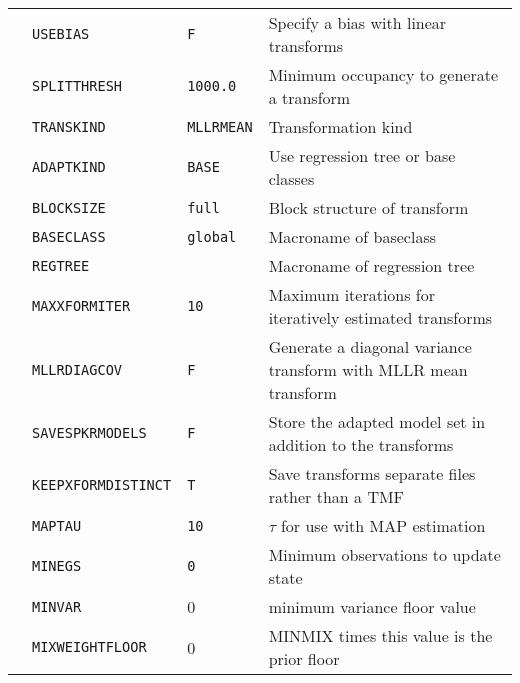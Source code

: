 \begin{center}
\begin{supertabular}{|p{1.4cm}|l|l|p{6.6cm}|}
  & \texttt{USEBIAS} & \texttt{F} & Specify a bias with linear transforms \\ 
  & \texttt{SPLITTHRESH} & \texttt{1000.0} & Minimum occupancy to generate a transform \\ 
    & \texttt{TRANSKIND} & \texttt{{\tt MLLRMEAN}} & Transformation kind \\ 
  & \texttt{ADAPTKIND} & \texttt{{\tt BASE}} & Use regression tree or base classes \\ 
  & \texttt{BLOCKSIZE} & \texttt{full} & Block structure of transform\\ 
  & \texttt{BASECLASS} & \texttt{global} & Macroname of baseclass\\ 
  & \texttt{REGTREE} & \texttt{} & Macroname of regression tree\\ 
  & \texttt{MAXXFORMITER} & \texttt{10} & Maximum iterations for iteratively estimated transforms \\ 
  & \texttt{MLLRDIAGCOV} & \texttt{F} & Generate a diagonal variance transform with MLLR mean transform \\ 
  & \texttt{SAVESPKRMODELS} & \texttt{F} & Store the adapted model set in addition to the transforms \\ 
  & \texttt{KEEPXFORMDISTINCT} & \texttt{T} & Save transforms separate files rather than a TMF \\ \hline

  & \texttt{MAPTAU} & \texttt{10} & $\tau$ for use with MAP estimation \\ 
  & \texttt{MINEGS} & \texttt{0} & Minimum observations to update state \\ 
  & \texttt{MINVAR} & 0 & minimum variance floor value \\ 
  & \texttt{MIXWEIGHTFLOOR} & 0 & MINMIX times this value is the prior floor \\ \hline


\end{supertabular}
\end{center}
